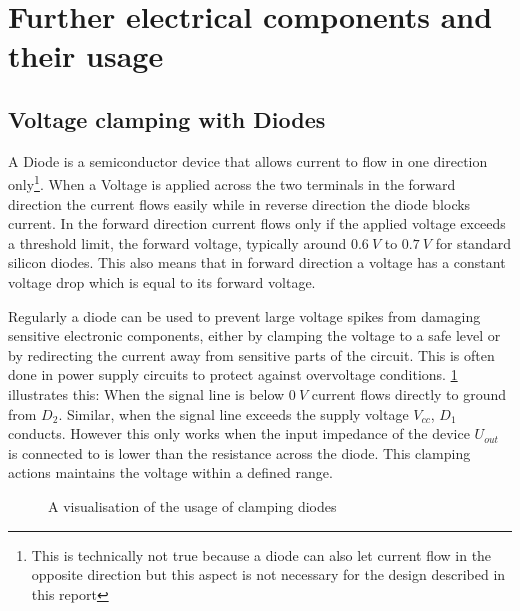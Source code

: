 \section{Further electrical components and their usage}

\subsection{Voltage clamping with Diodes}

A Diode is a semiconductor device that allows current to flow in one direction only\footnote{This is technically not true because a diode can also let current flow in the opposite direction but this aspect is not necessary for the design described in this report}. When a Voltage is applied across the two terminals in the forward direction the current flows easily while in reverse direction the diode blocks current. In the forward direction current flows only if the applied voltage exceeds a threshold limit, the forward voltage, typically around $\SI{0.6}{V}$ to $\SI{0.7}{V}$ for standard silicon diodes. This also means that in forward direction a voltage has a constant voltage drop which is equal to its forward voltage.

Regularly a diode can be used to prevent large voltage spikes from damaging sensitive electronic components, either by clamping the voltage to a safe level or by redirecting the current away from sensitive parts of the circuit. This is often done in power supply circuits to protect against overvoltage conditions. \cref{fig:clamping-diodes} illustrates this: When the signal line is below $\SI{0}{V}$ current flows directly to ground from $D_2$. Similar, when the signal line exceeds the supply voltage $V_{cc}$, $D_1$ conducts. However this only works when the input impedance of the device $U_{out}$ is connected to is lower than the resistance across the diode. This clamping actions maintains the voltage within a defined range.

\begin{figure}[htb]
	\centering
	\caption{A visualisation of the usage of clamping diodes}
	\label{fig:clamping-diodes}
\end{figure}

